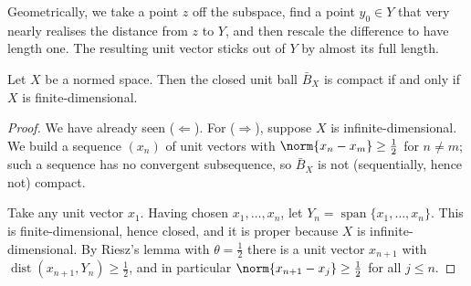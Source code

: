 \documentclass[a4paper]{scrartcl}
\newcommand{\spn}{\operatorname{span}}
\DeclareMathOperator{\dist}{dist}
\begin{document}
Geometrically, we take a point $z$ off the subspace, find a point $y_0 \in Y$ that very nearly realises the distance from $z$ to $Y$, and then rescale the difference to have length one. The resulting unit vector sticks out of $Y$ by almost its full length.

\begin{center}
\end{center}

\begin{theorem}[Riesz]
	Let $X$ be a normed space. Then the closed unit ball $\bar{B}_X$ is compact if and only if $X$ is finite-dimensional.
\end{theorem}

\begin{proof}
	We have already seen ($\Leftarrow$). For ($\Rightarrow$), suppose $X$ is infinite-dimensional. We build a sequence $(x_n)$ of unit vectors with $\norm{x_n - x_m} \geq \frac12$ for $n \neq m$; such a sequence has no convergent subsequence, so $\bar{B}_X$ is not (sequentially, hence not) compact.

	Take any unit vector $x_1$. Having chosen $x_1, \dots, x_n$, let $Y_n = \spn\{x_1, \dots, x_n\}$. This is finite-dimensional, hence closed, and it is proper because $X$ is infinite-dimensional. By Riesz's lemma with $\theta = \frac12$ there is a unit vector $x_{n+1}$ with $\dist(x_{n+1}, Y_n) \geq \frac12$, and in particular $\norm{x_{n+1} - x_j} \geq \frac12$ for all $j \leq n$.
\end{proof}
\end{document}
